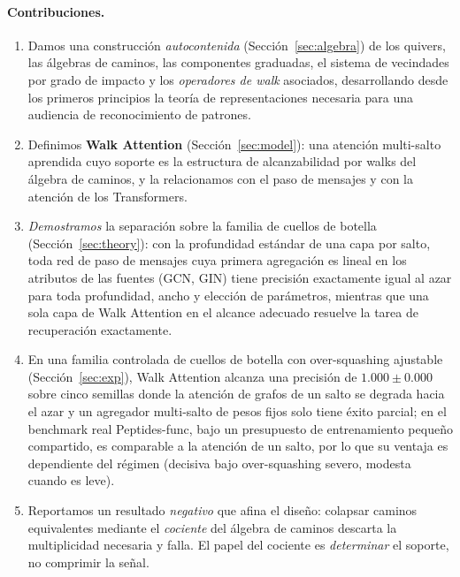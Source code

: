 \documentclass[runningheads]{llncs}
\begin{document}
\paragraph{Contribuciones.}
\begin{enumerate}
  \item Damos una construcci\'on \emph{autocontenida} (Secci\'on~\ref{sec:algebra})
  de los quivers, las \'algebras de caminos, las componentes graduadas, el sistema
  de vecindades por grado de impacto y los \emph{operadores de walk} asociados,
  desarrollando desde los primeros principios la teor\'ia de representaciones
  necesaria para una audiencia de reconocimiento de patrones.
  \item Definimos \textbf{Walk Attention} (Secci\'on~\ref{sec:model}): una
  atenci\'on multi-salto aprendida cuyo soporte es la estructura de alcanzabilidad
  por walks del \'algebra de caminos, y la relacionamos con el paso de mensajes y
  con la atenci\'on de los Transformers.
  \item \emph{Demostramos} la separaci\'on sobre la familia de cuellos de
  botella (Secci\'on~\ref{sec:theory}): con la profundidad est\'andar de una
  capa por salto, toda red de paso de mensajes cuya primera agregaci\'on es
  lineal en los atributos de las fuentes (GCN, GIN) tiene precisi\'on
  exactamente igual al azar para toda profundidad, ancho y elecci\'on de
  par\'ametros, mientras que una sola capa de Walk Attention en el alcance
  adecuado resuelve la tarea de recuperaci\'on exactamente.
  \item En una familia controlada de cuellos de botella con over-squashing
  ajustable (Secci\'on~\ref{sec:exp}), Walk Attention alcanza una precisi\'on de
  $1.000\pm0.000$ sobre cinco semillas donde la atenci\'on de grafos de un salto
  se degrada hacia el azar y un agregador multi-salto de pesos fijos solo tiene
  \'exito parcial; en el benchmark real Peptides-func, bajo un presupuesto de
  entrenamiento peque\~no compartido, es comparable a la atenci\'on de un salto,
  por lo que su ventaja es dependiente del r\'egimen (decisiva bajo
  over-squashing severo, modesta cuando es leve).
  \item Reportamos un resultado \emph{negativo} que afina el dise\~no: colapsar
  caminos equivalentes mediante el \emph{cociente} del \'algebra de caminos
  descarta la multiplicidad necesaria y falla. El papel del cociente es
  \emph{determinar} el soporte, no comprimir la se\~nal.
\end{enumerate}

\end{document}
